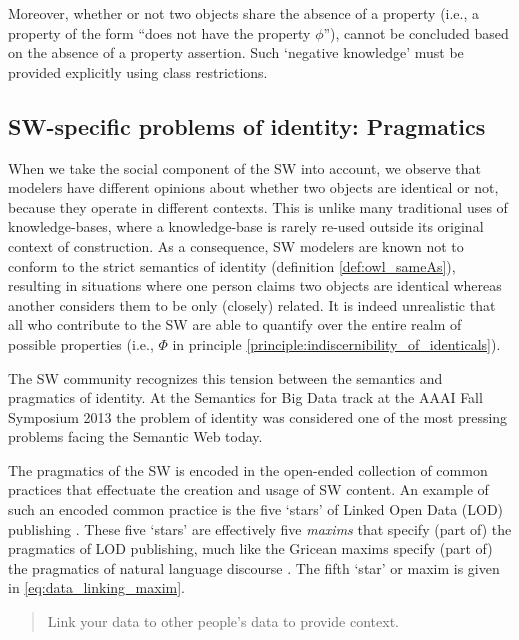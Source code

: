 Moreover, whether or not two objects share the absence of a property
  (i.e., a property of the form ``does not have the property $\phi$''),
  cannot be concluded based on the absence of a property assertion.
Such `negative knowledge' must be provided explicitly
  using class restrictions.

\subsection{SW-specific problems of identity: Pragmatics}

When we take the social component of the SW into account,
  we observe that modelers have different opinions about
  whether two objects are identical or not,
  because they operate in different contexts.
This is unlike many traditional uses of knowledge-bases,
  where a knowledge-base is rarely re-used outside its original
  context of construction.
As a consequence, SW modelers are known not to conform to
  the strict semantics of identity (definition \ref{def:owl_sameAs}),
  resulting in situations where one person
  claims two objects are identical
  whereas another considers them to be only (closely) related.
It is indeed unrealistic that all who contribute to the SW
  are able to quantify over the entire realm of possible properties
  (i.e., $\Phi$ in principle \ref{principle:indiscernibility_of_identicals}).

The SW community recognizes this tension between
  the semantics and pragmatics of identity.
At the Semantics for Big Data track at the AAAI Fall Symposium 2013
  \cite{SemanticsBigData2013}
  the problem of identity was considered one of the most
  pressing problems facing the Semantic Web today.

The pragmatics of the SW is encoded in the open-ended collection of
  common practices that effectuate the creation and usage of SW content.
An example of such an encoded common practice is the five `stars'
  of Linked Open Data (LOD) publishing \cite{Bernerslee2010}.
These five `stars' are effectively five \emph{maxims} that specify
  (part of) the pragmatics of LOD publishing,
  much like the Gricean maxims specify
  (part of) the pragmatics of natural language discourse \cite{Grice1989}.
The fifth `star' or maxim is given in \ref{eq:data_linking_maxim}.
\begin{principle}
  \label{eq:data_linking_maxim}
  \begin{quote}
    Link your data to other people's data to provide context.
  \end{quote}
\end{principle}

